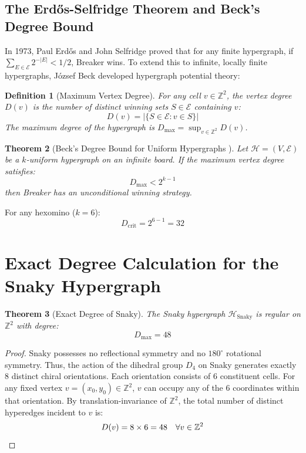 \documentclass[11pt,a4paper]{article}
\newtheorem{theorem}{Theorem}
\newtheorem{definition}[theorem]{Definition}
\begin{document}
\subsection{The Erd\H{o}s-Selfridge Theorem and Beck's Degree Bound}

In 1973, Paul Erd\H{o}s and John Selfridge \cite{erdos1973} proved that for any finite hypergraph, if $\sum_{E \in \mathcal{E}} 2^{-|E|} < 1/2$, Breaker wins. To extend this to infinite, locally finite hypergraphs, J\'ozsef Beck \cite{beck2008} developed hypergraph potential theory:

\begin{definition}[Maximum Vertex Degree]
For any cell $v \in \mathbb{Z}^2$, the vertex degree $D(v)$ is the number of distinct winning sets $S \in \mathcal{E}$ containing $v$:
\[ D(v) = |\{S \in \mathcal{E} : v \in S\}| \]
The maximum degree of the hypergraph is $D_{\max} = \sup_{v \in \mathbb{Z}^2} D(v)$.
\end{definition}

\begin{theorem}[Beck's Degree Bound for Uniform Hypergraphs \cite{beck2008}]
Let $\mathcal{H} = (V, \mathcal{E})$ be a $k$-uniform hypergraph on an infinite board. If the maximum vertex degree satisfies:
\[ D_{\max} < 2^{k-1} \]
then Breaker has an unconditional winning strategy.
\end{theorem}

For any hexomino ($k = 6$):
\[ D_{\text{crit}} = 2^{6-1} = 32 \]

\section{Exact Degree Calculation for the Snaky Hypergraph}

\begin{theorem}[Exact Degree of Snaky]
The Snaky hypergraph $\mathcal{H}_{\text{Snaky}}$ is regular on $\mathbb{Z}^2$ with degree:
\[ D_{\max} = 48 \]
\end{theorem}

\begin{proof}
Snaky possesses no reflectional symmetry and no $180^\circ$ rotational symmetry. Thus, the action of the dihedral group $D_4$ on Snaky generates exactly 8 distinct chiral orientations. Each orientation consists of 6 constituent cells. For any fixed vertex $v = (x_0, y_0) \in \mathbb{Z}^2$, $v$ can occupy any of the 6 coordinates within that orientation. By translation-invariance of $\mathbb{Z}^2$, the total number of distinct hyperedges incident to $v$ is:
\[ D(v) = 8 \times 6 = 48 \quad \forall v \in \mathbb{Z}^2 \qedhere \]
\end{proof}
\end{document}
